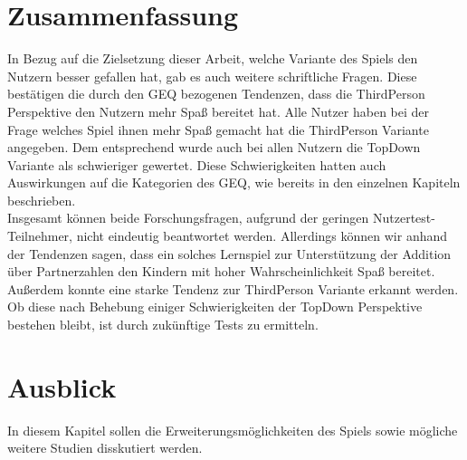 \section{Zusammenfassung}
\label{sec:conclusionDisk}
In Bezug auf die Zielsetzung dieser Arbeit, welche Variante des Spiels den Nutzern besser gefallen hat, gab es auch weitere schriftliche Fragen. Diese bestätigen die durch den GEQ bezogenen Tendenzen, dass die ThirdPerson Perspektive den Nutzern mehr Spaß bereitet hat. Alle Nutzer haben bei der Frage welches Spiel ihnen mehr Spaß gemacht hat die ThirdPerson Variante angegeben. Dem entsprechend wurde auch bei allen Nutzern die TopDown Variante als schwieriger gewertet. Diese Schwierigkeiten hatten auch Auswirkungen auf die Kategorien des GEQ, wie bereits in den einzelnen Kapiteln beschrieben.\\
Insgesamt können beide Forschungsfragen, aufgrund der geringen Nutzertest-Teilnehmer, nicht eindeutig beantwortet werden. Allerdings können wir anhand der Tendenzen sagen, dass ein solches Lernspiel zur Unterstützung der Addition über Partnerzahlen den Kindern mit hoher Wahrscheinlichkeit Spaß bereitet. Außerdem konnte eine starke Tendenz zur ThirdPerson Variante erkannt werden. Ob diese nach Behebung einiger Schwierigkeiten der TopDown Perspektive bestehen bleibt, ist durch zukünftige Tests zu ermitteln.
\section{Ausblick}
\label{sec:ausblickDisk}
In diesem Kapitel sollen die Erweiterungsmöglichkeiten des Spiels sowie mögliche weitere Studien disskutiert werden.
